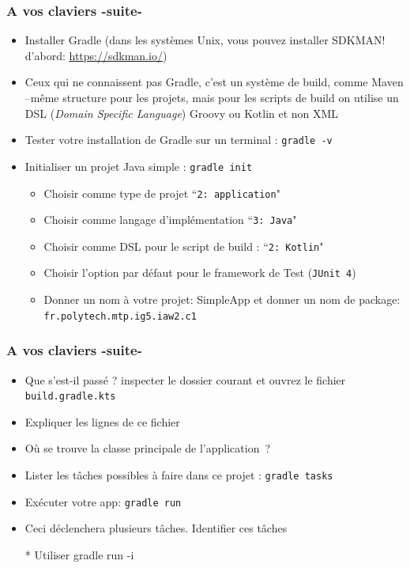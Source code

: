 \documentclass{beamer}
\begin{document}
\begin{frame}
	\frametitle{A vos claviers -suite-}
	
	\begin{itemize}
		\item Installer Gradle (dans les systèmes Unix, vous pouvez installer SDKMAN! d'abord: \url{https://sdkman.io/})
		\item Ceux qui ne connaissent pas Gradle, c'est un système de build, comme Maven --même structure pour les projets, mais pour les scripts de build on utilise un DSL (\textit{Domain Specific Language}) Groovy ou Kotlin et non XML
		\item Tester votre installation de Gradle sur un terminal : \texttt{gradle -v}
		\item Initialiser un projet Java simple : \texttt{gradle init}
		\begin{itemize}
			\item Choisir comme type de projet  ``\texttt{2: application}"
			\item Choisir comme langage d'implémentation ``\texttt{3: Java}"
			\item Choisir comme DSL pour le script de build : ``\texttt{2: Kotlin}"
			\item Choisir l'option par défaut pour le framework de Test (\texttt{JUnit 4})
			\item Donner un nom à votre projet: SimpleApp et donner un nom de package: \texttt{fr.polytech.mtp.ig5.iaw2.c1}
		\end{itemize} 
\end{itemize}
\end{frame}

\begin{frame}
\frametitle{A vos claviers -suite-}

\begin{itemize}
	\item Que s'est-il passé ? inspecter le dossier courant et ouvrez le fichier \texttt{build.gradle.kts}
	\item Expliquer les lignes de ce fichier
	\item Où se trouve la classe principale de l'application~?
	\item Lister les tâches possibles à faire dans ce projet : \texttt{gradle tasks}
	\item Exécuter votre app: \texttt{gradle run}
	\item Ceci déclenchera plusieurs tâches. Identifier ces tâches
	\item[*]Utiliser gradle run -i
	\end{itemize}
\end{frame}
\end{document}
